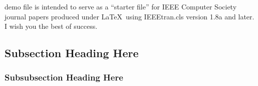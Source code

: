 \documentclass[10pt,journal,compsoc]{IEEEtran}
\begin{document}
\maketitle


\IEEEdisplaynontitleabstractindextext



%
\IEEEpeerreviewmaketitle





 demo file is intended to serve as a ``starter
file'' for IEEE Computer Society journal papers produced under \LaTeX\
using IEEEtran.cls version 1.8a and later. I wish you the best of
success.

 

\subsection{Subsection Heading Here}
\label{sec:subs-head-here}


\subsubsection{Subsubsection Heading Here}
\label{sec:subs-head-here-1}
\end{document}
